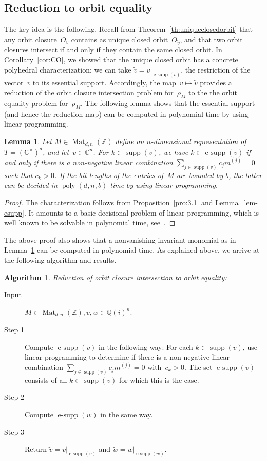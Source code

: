 \documentclass[10pt,a4paper]{article}
\DeclareMathOperator{\supp}{supp}
\DeclareMathOperator{\esupp}{e-supp}
\DeclareMathOperator{\poly}{poly}
\DeclareMathOperator{\Mat}{Mat}
\newtheorem{lemma}[theorem]{Lemma}
\theoremstyle{definition}
\newtheorem{algorithm}[theorem]{Algorithm}
\numberwithin{equation}{section}
\newcommand{\QQ}{\mathbb{Q}}
\newcommand{\CC}{\mathbb{C}}
\newcommand{\ZZ}{\mathbb{Z}}
\begin{document}
%
\subsection{Reduction to orbit equality}
%

The key idea is the following.
Recall from Theorem~\ref{th:uniqueclosedorbit} that any orbit closure~$\overline{O_v}$ contains as unique closed orbit~$O_{\tilde v}$, and that two orbit closures intersect if and only if they contain the same closed orbit.
In Corollary~\ref{cor:CO}, we showed that the unique closed orbit has a concrete polyhedral characterization: we can take $\tilde v = v|_{\esupp(v)}$, the restriction of the vector~$v$ to its essential support.
Accordingly, the map~$v\mapsto \widetilde{v}$ provides a reduction of the orbit closure intersection problem for~$\rho_M$ to the the orbit equality problem for~$\rho_M$.
The following lemma shows that the essential support (and hence the reduction map) can be computed in polynomial time by using linear programming.

\begin{lemma}\label{lem-esupp-poly}
Let $M \in\Mat_{d,n}(\ZZ)$ define an $n$-dimensional representation of $T = (\CC^\times)^d$, and let~$v\in \CC^n$.
For $k\in\supp(v)$, we have $k \in \esupp(v)$ if and only if there is a non-negative linear combination $\sum_{j \in \supp(v)} c_j m^{(j)} = 0$ such that $c_k > 0$.
If the bit-lengths of the entries of~$M$ are bounded by $b$, the latter can be decided in $\poly(d,n,b)$-time by using linear programming.
\end{lemma}

\begin{proof}
The characterization follows from Proposition~\ref{pro:3.1} and Lemma~\ref{lem-esupp}.
It amounts to a basic decisional problem of linear programming, which is well known to be solvable in polynomial time,
see~\cite{GLS-book}.
\end{proof}

The above proof also shows that a nonvanishing invariant monomial as in Lemma~\ref{lem-esupp-poly} can be computed in polynomial time.
As explained above, we arrive at the following algorithm and results.

\begin{algorithm}\label{algo:oci-to-oe} \emph{Reduction of orbit closure intersection to orbit equality:}
\begin{description}
\item[Input] $M \in \Mat_{d,n}(\ZZ), v,w \in \QQ(i)^n$.
\item[Step 1] Compute $\esupp(v)$ in the following way:
For each $k\in\supp(v)$, use linear programming to determine if there is a non-negative linear combination $\sum_{j \in \supp(v)} c_j m^{(j)} = 0$ with~$c_k>0$.
The set $\esupp(v)$ consists of all $k\in\supp(v)$ for which this is the case.
\item[Step 2] Compute $\esupp(w)$ in the same way.
\item[Step 3] Return $\tilde v = v|_{\esupp(v)}$ and $\tilde w = w|_{\esupp(w)}$.
\end{description}
\end{algorithm}
\end{document}

